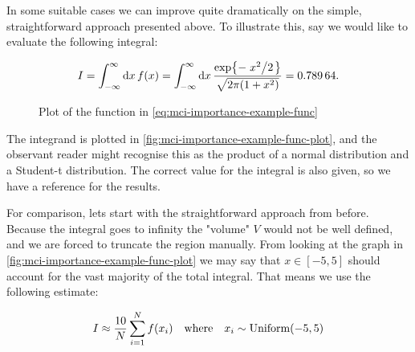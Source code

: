 \documentclass[Thesis.tex]{subfiles}
\begin{document}
In some suitable cases we can improve quite dramatically on the simple,
straightforward approach presented above. To illustrate this, say we
would like to evaluate the following integral:

\begin{align}
    \label{eq:mci-importance-example-func}
    I = \intfy\dd{x}f(x)=\intfy\dd{x} \frac{\exp{-\flatfrac{x^2}{2} }}{\sqrt{2\pi \qty(1 +x^2)}}  = \num{0.78964}.
\end{align}

\begin{figure}
    \centering
    \caption{\label{fig:mci-importance-example-func-plot}Plot of the function in \autoref{eq:mci-importance-example-func}}
\end{figure}
The integrand is plotted in \autoref{fig:mci-importance-example-func-plot}, and
the observant reader might recognise this as the product of a normal
distribution and a Student-t distribution. The correct value for the integral
is also given, so we have a reference for the results.

For comparison, lets start with the straightforward approach from before.
Because the integral goes to infinity the "volume" $V$ would not be well
defined, and we are forced to truncate the region manually. From looking at the
graph in \autoref{fig:mci-importance-example-func-plot} we may say that $x\in
[-5, 5]$ should account for the vast majority of the total integral. That means
we use the following estimate:

\begin{align}
    \label{eq:chp-mc-anon-2}
    I\approx \frac{10}{N}\sum_{i=1}^Nf(x_i)\qq{where} x_i\sim\text{Uniform}(-5, 5)
\end{align}
\end{document}
